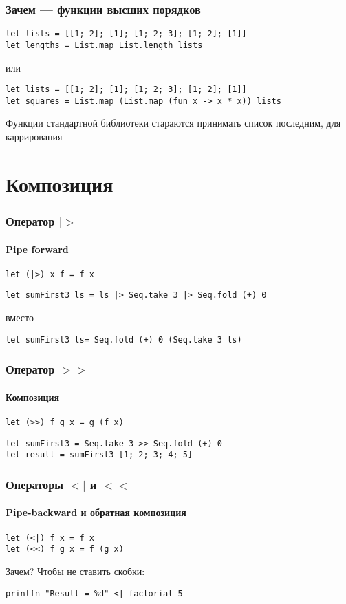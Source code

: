 \documentclass{../../slides-style}
\begin{document}
    \begin{frame}[fragile]
        \frametitle{Зачем --- функции высших порядков}
        \begin{verbatim}
let lists = [[1; 2]; [1]; [1; 2; 3]; [1; 2]; [1]]
let lengths = List.map List.length lists
        \end{verbatim}
        или
        \begin{verbatim}
let lists = [[1; 2]; [1]; [1; 2; 3]; [1; 2]; [1]]
let squares = List.map (List.map (fun x -> x * x)) lists
        \end{verbatim}
        \vspace{3mm}
        Функции стандартной библиотеки стараются принимать список последним, для каррирования
    \end{frame}

    \section{Композиция}

    \begin{frame}[fragile]
        \frametitle{Оператор $|>$}
        \framesubtitle{Pipe forward}
        \begin{verbatim}
let (|>) x f = f x
        \end{verbatim}

        \begin{verbatim}
let sumFirst3 ls = ls |> Seq.take 3 |> Seq.fold (+) 0
        \end{verbatim}
        вместо
        \begin{verbatim}
let sumFirst3 ls= Seq.fold (+) 0 (Seq.take 3 ls)
        \end{verbatim}
    \end{frame}

    \begin{frame}[fragile]
        \frametitle{Оператор $>>$}
        \framesubtitle{Композиция}
        \begin{verbatim}
let (>>) f g x = g (f x)
        \end{verbatim}
        \begin{verbatim}
let sumFirst3 = Seq.take 3 >> Seq.fold (+) 0
let result = sumFirst3 [1; 2; 3; 4; 5]
        \end{verbatim}
    \end{frame}

    \begin{frame}[fragile]
        \frametitle{Операторы $<|$ и $<<$}
        \framesubtitle{Pipe-backward и обратная композиция}
        \begin{verbatim}
let (<|) f x = f x
let (<<) f g x = f (g x)
        \end{verbatim}
        Зачем? Чтобы не ставить скобки:
        \begin{verbatim}
printfn "Result = %d" <| factorial 5
        \end{verbatim}
    \end{frame}
\end{document}
